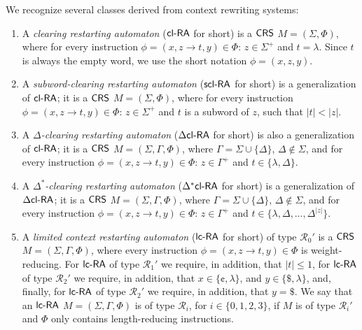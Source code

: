 \begin{definition}\label{definition:derived-classes}
We recognize several classes derived from context rewriting systems:
\begin{enumerate}
\item\label{definition:clra} A \emph{clearing restarting automaton} \cite{CM10} (\index{$\clRA$}\emph{$\clRA$} for short) is a $\textup{\sf CRS\/}$ $M = (\Sigma, \Phi)$, where for every instruction $\phi = (x, z \to t, y) \in \Phi$: $z \in \Sigma^+$ and $t = \lambda$. Since $t$ is always the empty word, we use the short notation $\phi = (x, z, y)$.

\item\label{definition:sclra}
A \emph{subword-clearing restarting automaton} \cite{C12} (\index{$\sclRA$}\emph{$\sclRA$} for short) is a generalization of $\clRA$; it is a $\textup{\sf CRS\/}$ $M = (\Sigma, \Phi)$, where for every instruction $\phi = (x, z \to t, y) \in \Phi$: $z \in \Sigma^+$ and $t$ is a subword of $z$, such that $|t| < |z|$.

\item\label{definition:dclra} A \emph{$\Delta$-clearing restarting automaton} \cite{CM10} (\index{$\DclRA$}\emph{$\DclRA$} for short) is also a generalization of $\clRA$; it is a $\textup{\sf CRS\/}$ $M = (\Sigma, \Gamma, \Phi)$, where $\Gamma = \Sigma \cup \{\Delta\}$, $\Delta \notin \Sigma$, and for every instruction $\phi = (x, z \to t, y) \in \Phi$: $z \in \Gamma^+$ and $t \in \{\lambda, \Delta\}$.

\item\label{definition:dxclra} A \emph{$\Delta^*$-clearing restarting automaton} \cite{CM10} (\index{$\DXclRA$}\emph{$\DXclRA$} for short) is a generalization of $\DclRA$; it is a $\textup{\sf CRS\/}$ $M = (\Sigma, \Gamma, \Phi)$, where $\Gamma = \Sigma \cup \{\Delta\}$, $\Delta \notin \Sigma$, and for every instruction $\phi = (x, z \to t, y) \in \Phi$: $z \in \Gamma^+$ and $t \in \{\lambda, \Delta, \ldots, \Delta^{|z|}\}$.

\item \label{definition:lcra} A \emph{limited context restarting automaton} \cite{B10Diploma, B11, OCM13} (\index{$\lcRA$}\emph{$\lcRA$} for short) of type $\mathcal{R}_0'$ is a $\textup{\sf CRS\/}$ $M = (\Sigma, \Gamma, \Phi)$, where every instruction $\phi = (x, z \to t, y) \in \Phi$ is weight-reducing. For $\lcRA$ of type $\mathcal{R}_1'$ we require, in addition, that $|t| \le 1$, for $\lcRA$ of type $\mathcal{R}_2'$ we require, in addition, that $x \in \{\cent, \lambda\}$, and $y \in \{\$, \lambda\}$, and, finally, for $\lcRA$ of type $\mathcal{R}_2'$ we require, in addition, that $y = \$$. We say that an $\lcRA$ $M=(\Sigma,\Gamma,\Phi)$ is of type $\mathcal{R}_i$, for $i \in \{0, 1, 2, 3\}$, if $M$ is of type $\mathcal{R}_i'$ and $\Phi$ only contains length-reducing instructions.
\end{enumerate}
\end{definition}

